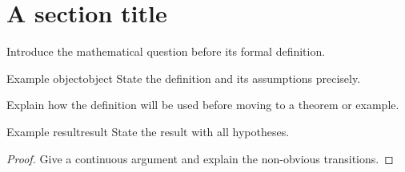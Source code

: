 \documentclass[11pt]{article}
\begin{document}
\tableofcontents

\section{A section title}
Introduce the mathematical question before its formal definition.

\begin{definition}{Example object}{object}
State the definition and its assumptions precisely.
\end{definition}

Explain how the definition will be used before moving to a theorem or example.

\begin{theorem}{Example result}{result}
State the result with all hypotheses.
\end{theorem}
\begin{proof}
Give a continuous argument and explain the non-obvious transitions.
\end{proof}
\end{document}
